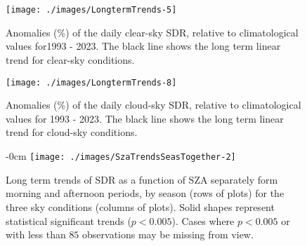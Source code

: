 
\renewcommand\thefigure{\thesection.\arabic{figure}}

\appendix
\section{}

\setcounter{figure}{0}    %



\begin{figure}[h!]
    {\centering
        \texttt{[image: ./images/LongtermTrends-5]}
    }
    \caption{Anomalies (\%) of the daily clear-sky SDR, relative to climatological values for1993 - 2023. The black line shows the long term linear trend for clear-sky conditions.}\label{fig:trendCLEAR}
\end{figure}



\begin{figure}[h!]
    {\centering
        \texttt{[image: ./images/LongtermTrends-8]}

    }
    \caption{Anomalies (\%) of the daily cloud-sky SDR, relative to climatological values for 1993 - 2023. The black line shows the long term linear trend for cloud-sky conditions.}\label{fig:trendCLOUD}
\end{figure}



\begin{figure}[h!]
    \begin{adjustwidth}{-\extralength}{0cm}
        {\centering
            \texttt{[image: ./images/SzaTrendsSeasTogether-2]}
        }
        \caption{Long term trends of SDR as a function of SZA separately form morning
               and afternoon periods, by season (rows of plots) for the three sky
               conditions (columns of plots).
               Solid shapes represent statistical significant trends ($p<0.005$).
               Cases where $p<0.005$ or with less than $85$ observations may be
               missing from view.}\label{fig:SZAtrendSeason}
    \end{adjustwidth}
\end{figure}


